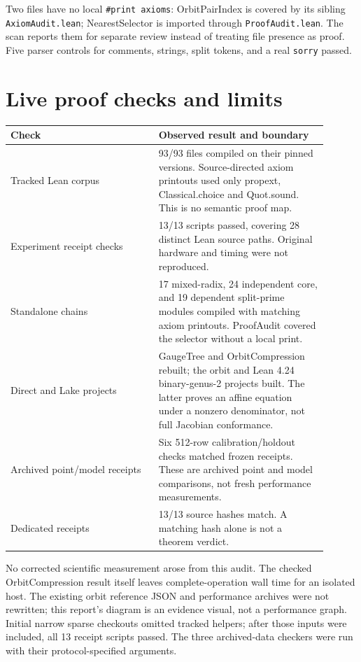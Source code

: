 \documentclass[10pt]{article}
\newcommand{\mono}[1]{\texttt{#1}}
\begin{document}
Two files have no local \mono{\#print axioms}: OrbitPairIndex is covered by
its sibling \mono{AxiomAudit.lean}; NearestSelector is imported through
\mono{ProofAudit.lean}. The scan reports them for separate review instead
of treating file presence as proof. Five parser controls for comments,
strings, split tokens, and a real \mono{sorry} passed.

\section*{Live proof checks and limits}
\begin{tabular}{|p{0.42\linewidth}|p{0.48\linewidth}|}\hline
Check & Observed result and boundary \\ \hline
Tracked Lean corpus & 93/93 files compiled on their pinned versions. Source-directed axiom printouts used only propext, Classical.choice and Quot.sound. This is no semantic proof map. \\ \hline
Experiment receipt checks & 13/13 scripts passed, covering 28 distinct Lean source paths. Original hardware and timing were not reproduced. \\ \hline
Standalone chains & 17 mixed-radix, 24 independent core, and 19 dependent split-prime modules compiled with matching axiom printouts. ProofAudit covered the selector without a local print. \\ \hline
Direct and Lake projects & GaugeTree and OrbitCompression rebuilt; the orbit and Lean 4.24 binary-genus-2 projects built. The latter proves an affine equation under a nonzero denominator, not full Jacobian conformance. \\ \hline
Archived point/model receipts & Six 512-row calibration/holdout checks matched frozen receipts. These are archived point and model comparisons, not fresh performance measurements. \\ \hline
Dedicated receipts & 13/13 source hashes match. A matching hash alone is not a theorem verdict. \\ \hline
\end{tabular}

No corrected scientific measurement arose from this audit. The checked
OrbitCompression result itself leaves complete-operation wall time for an
isolated host. The existing orbit reference JSON and performance archives
were not rewritten; this report's diagram is an evidence visual, not a
performance graph. Initial narrow sparse checkouts omitted tracked helpers;
after those inputs were included, all 13 receipt scripts passed. The three
archived-data checkers were run with their protocol-specified arguments.
\end{document}
